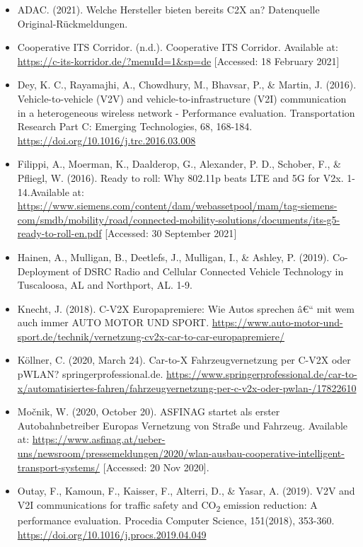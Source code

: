 \documentclass[
]{book}
\providecommand{\tightlist}{%
  \setlength{\itemsep}{0pt}\setlength{\parskip}{0pt}}
\begin{document}
\begin{itemize}
\tightlist
\item
  ADAC. (2021). Welche Hersteller bieten bereits C2X an? Datenquelle Original-Rückmeldungen.
\item
  Cooperative ITS Corridor. (n.d.). Cooperative ITS Corridor. Available at: \url{https://c-its-korridor.de/?menuId=1\&sp=de} {[}Accessed: 18 February 2021{]}
\item
  Dey, K. C., Rayamajhi, A., Chowdhury, M., Bhavsar, P., \& Martin, J. (2016). Vehicle-to-vehicle (V2V) and vehicle-to-infrastructure (V2I) communication in a heterogeneous wireless network - Performance evaluation. Transportation Research Part C: Emerging Technologies, 68, 168-184. \url{https://doi.org/10.1016/j.trc.2016.03.008}
\item
  Filippi, A., Moerman, K., Daalderop, G., Alexander, P. D., Schober, F., \& Pfliegl, W. (2016). Ready to roll: Why 802.11p beats LTE and 5G for V2x. 1-14.Available at: \url{https://www.siemens.com/content/dam/webassetpool/mam/tag-siemens-com/smdb/mobility/road/connected-mobility-solutions/documents/its-g5-ready-to-roll-en.pdf} {[}Accessed: 30 September 2021{]}
\item
  Hainen, A., Mulligan, B., Deetlefs, J., Mulligan, I., \& Ashley, P. (2019). Co-Deployment of DSRC Radio and Cellular Connected Vehicle Technology in Tuscaloosa, AL and Northport, AL. 1-9.
\item
  Knecht, J. (2018). C-V2X Europapremiere: Wie Autos sprechen â€`` mit wem auch immer \textbar{} AUTO MOTOR UND SPORT. \url{https://www.auto-motor-und-sport.de/technik/vernetzung-cv2x-car-to-car-europapremiere/}
\item
  Köllner, C. (2020, March 24). Car-to-X \textbar{} Fahrzeugvernetzung per C-V2X oder pWLAN? \textbar{} springerprofessional.de. \url{https://www.springerprofessional.de/car-to-x/automatisiertes-fahren/fahrzeugvernetzung-per-c-v2x-oder-pwlan-/17822610}
\item
  Močnik, W. (2020, October 20). ASFINAG startet als erster Autobahnbetreiber Europas Vernetzung von Straße und Fahrzeug. Available at: \url{https://www.asfinag.at/ueber-uns/newsroom/pressemeldungen/2020/wlan-ausbau-cooperative-intelligent-transport-systems/} {[}Accessed: 20 Nov 2020{]}.
\item
  Outay, F., Kamoun, F., Kaisser, F., Alterri, D., \& Yasar, A. (2019). V2V and V2I communications for traffic safety and CO\textsubscript{2} emission reduction: A performance evaluation. Procedia Computer Science, 151(2018), 353-360. \url{https://doi.org/10.1016/j.procs.2019.04.049}
\end{itemize}
\end{document}
